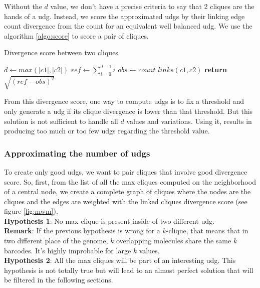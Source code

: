 Without the $d$ value, we don't have a precise criteria to say that 2 cliques are the hands of a udg.
Instead, we score the approximated udgs by their linking edge count divergence from the count for an equivalent well balanced udg.
We use the algorithm \ref{algo:score} to score a pair of cliques.

\begin{algorithm}
    \caption{Divergence score between two cliques}
    \label{algo:score}
    \begin{algorithmic}[1] %
         
            \State $d \gets max(|c1|, |c2|)$ 
            \State $ref \gets \sum_{i=0}^{d-1}i$
            \State $obs \gets count\_links(c1, c2)$
            \State \textbf{return} $\sqrt{(ref - obs)^2}$ 
        \EndProcedure
    \end{algorithmic}
\end{algorithm}

From this divergence score, one way to compute udgs is to fix a threshold and only generate a udg if its clique divergence is lower than that threshold.
But this solution is not sufficient to handle all $d$ values and variations.
Using it, results in producing too much or too few udgs regarding the threshold value.

\subsubsection*{Approximating the number of udgs}

To create only good udgs, we want to pair cliques that involve good divergence score.
So, first, from the list of all the max cliques computed on the neighborhood of a central node, we create a complete graph of cliques where the nodes are the cliques and the edges are weighted with the linked cliques divergence score (see figure \ref{fig:mwm}).\\
\textbf{Hypothesis 1}: No max clique is present inside of two different udg.\\
\textbf{Remark}: If the previous hypothesis is wrong for a $k$-clique, that means that in two different place of the genome, $k$ overlapping molecules share the same $k$ barcodes. It's highly improbable for large $k$ values.\\
\textbf{Hypothesis 2}: All the max cliques will be part of an interesting udg. This hypothesis is not totally true but will lead to an almost perfect solution that will be filtered in the following sections.

